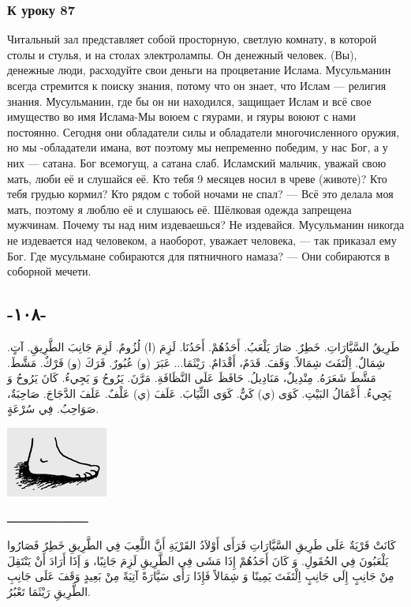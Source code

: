 \documentclass[a5paper]{article}
\begin{document}
\subsubsection{К уроку 87}
Читальный зал представляет собой просторную, светлую комнату, в которой столы и стулья, и на столах электролампы. Он денежный человек. (Вы), денежные люди, расходуйте свои деньги на процветание Ислама. Мусульманин всегда стремится к поиску знания, потому что он знает, что Ислам — религия знания. Мусульманин, где бы он ни находился, защищает Ислам и всё свое имущество во имя Ислама-Мы воюем с гяурами, и гяуры воюют с нами постоянно. Сегодня они обладатели силы и обладатели многочисленного оружия, но мы -обладатели имана, вот поэтому мы непременно победим, у нас Бог, а у них — сатана. Бог всемогущ, а сатана слаб. Исламский мальчик, уважай свою мать, люби её и слушайся её. Кто тебя 9 месяцев носил в чреве (животе)? Кто тебя грудью кормил? Кто рядом с тобой ночами не спал? — Всё это делала моя мать, поэтому я люблю её и слушаюсь её. Шёлковая одежда запрещена мужчинам. Почему ты над ним издеваешься? Не издевайся. Мусульманин никогда не издевается над человеком, а наоборот, уважает человека, — так приказал ему Бог. Где мусульмане собираются для пятничного намаза? — Они собираются в соборной мечети.

\subsection{-١٠٨-}
طَرِيقُ السَّيَّارَاتِ. خَطِرٌ. صَارَ يَلْعَبُ. أَحَدُهُمْ. أَحَدُنَا. لَزِمَ (ا) لُزُومٌ. لَزِمَ جَانِبَ الطَّرِيقِ. آتٍ. شِمَالٌ. اِلْتَفَتَ شِمَالاً. وَقَفَ. قَدَمٌ، أَقْدَامٌ. رَيْثَمَا... عَبَرَ (و) عُبُورٌ. فَرَكَ (و) فَرْكٌ. مَشَّطَ. مَشَّطَ شَعَرَهُ. مِنْدِيلٌ، مَنَادِيلُ. حَافَظَ عَلَى النَّظَافَةِ. مَرَّنَ. يَرُوحُ وَ يَجِيءُ. كَانَ يَرُوحُ وَ يَجِيءُ. أَعْمَالُ البَيْتِ. كَوَى (ي) كَيٌّ. كَوَى الثِّيَابَ. عَلَفَ (ي) عَلْفٌ. عَلَفَ الدَّجَاجَ. صَاحِبَةٌ، صَوَاحِبُ. فِي سُرْعَةٍ.

\begin{center}
\includegraphics[width=1.311in,height=0.9055in]{images/MuhammadBagauddinprettified-img281.png}
\end{center}
ـــــــــــــــــــــــــ

كَانَتْ قَرْيَةٌ عَلَى طَرِيقِ السَّيَّارَاتِ فَرَأَى أَوْلاَدُ القَرْيَةِ أَنَّ اللَّعِبَ فِي الطَّرِيقِ خَطِرٌ فَصَارُوا يَلْعَبُونَ فِي الحُقَولِ. وَ كَانَ أَحَدُهُمْ إِذَا مَشَى فِي الطَّرِيقِ لَزِمَ جَانِبًا، وَ إَذَا أَرَادَ أَنْ يَنْتَقِلَ مِنْ جَانِبٍ إِلَى جَانِبٍ اِلْتَفَتَ يَمِينًا وَ شِمَالاً فَإِذَا رَأَى سَيَّارَةً آتِيَةً مِنْ بَعِيدٍ وَقَفَ عَلَى جَانِبِ الطَّرِيقِ رَيْثَمَا تَعْبُرُ. 
\end{document}
